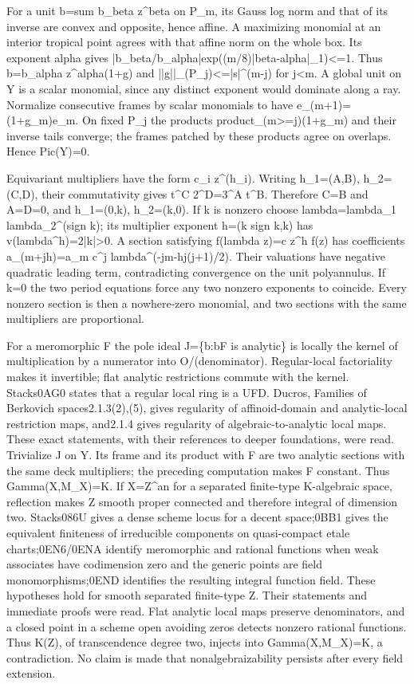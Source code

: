\documentclass[11pt]{article}
\begin{document}
For a unit b=sum b\_beta z\textasciicircum{}beta on P\_m, its Gauss log norm and that of its inverse are convex and opposite, hence affine. A maximizing monomial at an interior tropical point agrees with that affine norm on the whole box. Its exponent alpha gives |b\_beta/b\_alpha|exp((m/8)|beta-alpha|\_1)<=1. Thus b=b\_alpha z\textasciicircum{}alpha(1+g) and ||g||\_(P\_j)<=|s|\textasciicircum{}(m-j) for j<m. A global unit on Y is a scalar monomial, since any distinct exponent would dominate along a ray. Normalize consecutive frames by scalar monomials to have e\_(m+1)=(1+g\_m)e\_m. On fixed P\_j the products product\_(m>=j)(1+g\_m) and their inverse tails converge; the frames patched by these products agree on overlaps. Hence Pic(Y)=0.

Equivariant multipliers have the form c\_i z\textasciicircum{}(h\_i). Writing h\_1=(A,B), h\_2=(C,D), their commutativity gives t\textasciicircum{}C 2\textasciicircum{}D=3\textasciicircum{}A t\textasciicircum{}B. Therefore C=B and A=D=0, and h\_1=(0,k), h\_2=(k,0). If k is nonzero choose lambda=lambda\_1 lambda\_2\textasciicircum{}(sign k); its multiplier exponent h=(k sign k,k) has v(lambda\textasciicircum{}h)=2|k|>0. A section satisfying f(lambda z)=c z\textasciicircum{}h f(z) has coefficients a\_(m+jh)=a\_m c\textasciicircum{}j lambda\textasciicircum{}(-jm-hj(j+1)/2). Their valuations have negative quadratic leading term, contradicting convergence on the unit polyannulus. If k=0 the two period equations force any two nonzero exponents to coincide. Every nonzero section is then a nowhere-zero monomial, and two sections with the same multipliers are proportional.

For a meromorphic F the pole ideal J=\{b:bF is analytic\} is locally the kernel of multiplication by a numerator into O/(denominator). Regular-local factoriality makes it invertible; flat analytic restrictions commute with the kernel. Stacks0AG0 states that a regular local ring is a UFD. Ducros, Families of Berkovich spaces2.1.3(2),(5), gives regularity of affinoid-domain and analytic-local restriction maps, and2.1.4 gives regularity of algebraic-to-analytic local maps. These exact statements, with their references to deeper foundations, were read. Trivialize J on Y. Its frame and its product with F are two analytic sections with the same deck multipliers; the preceding computation makes F constant. Thus Gamma(X,M\_X)=K. If X=Z\textasciicircum{}an for a separated finite-type K-algebraic space, reflection makes Z smooth proper connected and therefore integral of dimension two. Stacks086U gives a dense scheme locus for a decent space;0BB1 gives the equivalent finiteness of irreducible components on quasi-compact etale charts;0EN6/0ENA identify meromorphic and rational functions when weak associates have codimension zero and the generic points are field monomorphisms;0END identifies the resulting integral function field. These hypotheses hold for smooth separated finite-type Z. Their statements and immediate proofs were read. Flat analytic local maps preserve denominators, and a closed point in a scheme open avoiding zeros detects nonzero rational functions. Thus K(Z), of transcendence degree two, injects into Gamma(X,M\_X)=K, a contradiction. No claim is made that nonalgebraizability persists after every field extension.
\end{document}
